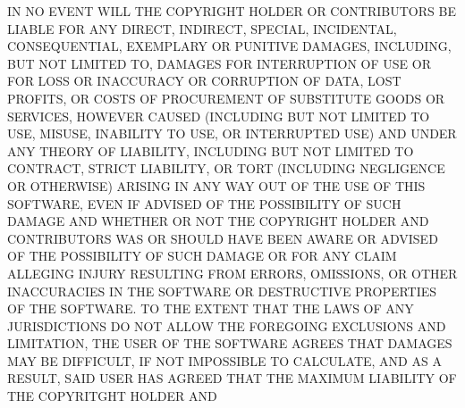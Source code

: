 \documentclass[10pt]{article}
\begin{document}
IN NO EVENT WILL THE COPYRIGHT HOLDER OR CONTRIBUTORS BE LIABLE FOR ANY 
DIRECT, INDIRECT, SPECIAL, INCIDENTAL, CONSEQUENTIAL, EXEMPLARY OR 
PUNITIVE DAMAGES, INCLUDING, BUT NOT LIMITED TO, DAMAGES FOR INTERRUPTION 
OF USE OR FOR LOSS OR INACCURACY OR CORRUPTION OF DATA, LOST PROFITS, OR 
COSTS OF PROCUREMENT OF SUBSTITUTE GOODS OR SERVICES, HOWEVER CAUSED 
(INCLUDING BUT NOT LIMITED TO USE, MISUSE, INABILITY TO USE, OR 
INTERRUPTED USE) AND UNDER ANY THEORY OF LIABILITY, INCLUDING BUT NOT 
LIMITED TO CONTRACT, STRICT LIABILITY, OR TORT (INCLUDING NEGLIGENCE OR 
OTHERWISE) ARISING IN ANY WAY OUT OF THE USE OF THIS SOFTWARE, EVEN IF 
ADVISED OF THE POSSIBILITY OF SUCH DAMAGE AND WHETHER OR NOT THE 
COPYRIGHT HOLDER AND CONTRIBUTORS WAS OR SHOULD HAVE BEEN AWARE OR 
ADVISED OF THE POSSIBILITY OF SUCH DAMAGE OR FOR ANY CLAIM ALLEGING 
INJURY RESULTING FROM ERRORS, OMISSIONS, OR OTHER INACCURACIES IN THE 
SOFTWARE OR DESTRUCTIVE PROPERTIES OF THE SOFTWARE.  TO THE EXTENT THAT 
THE LAWS OF ANY JURISDICTIONS DO NOT ALLOW THE FOREGOING EXCLUSIONS AND 
LIMITATION, THE USER OF THE SOFTWARE AGREES THAT DAMAGES MAY BE 
DIFFICULT, IF NOT IMPOSSIBLE TO CALCULATE, AND AS A RESULT, SAID USER HAS 
AGREED THAT THE MAXIMUM LIABILITY OF THE COPYRITGHT HOLDER AND 
\end{document}
